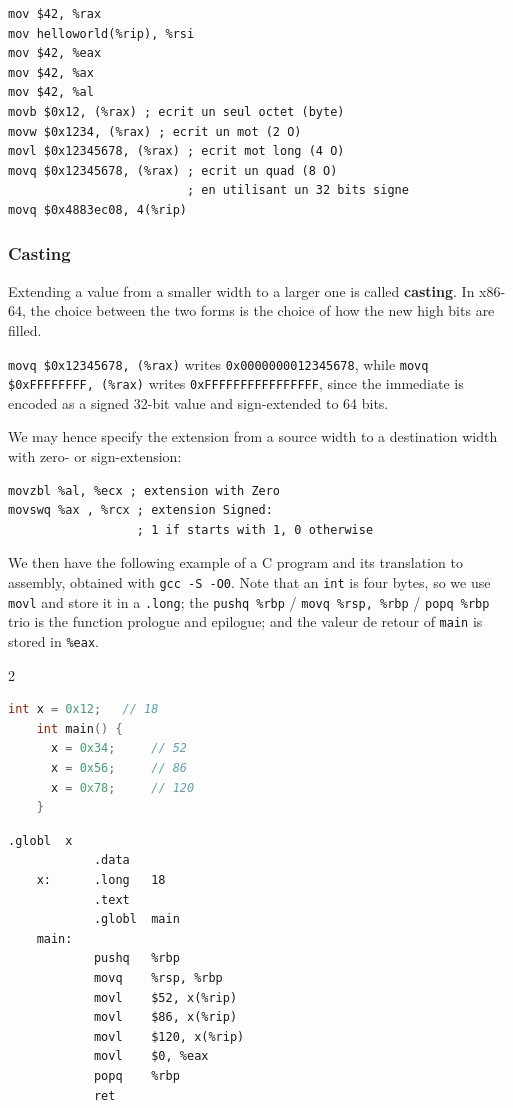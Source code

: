 \begin{lstlisting}[language=gas]
mov $42, %rax
mov helloworld(%rip), %rsi
mov $42, %eax
mov $42, %ax
mov $42, %al
movb $0x12, (%rax) ; ecrit un seul octet (byte)
movw $0x1234, (%rax) ; ecrit un mot (2 O)
movl $0x12345678, (%rax) ; ecrit mot long (4 O)
movq $0x12345678, (%rax) ; ecrit un quad (8 O)
                         ; en utilisant un 32 bits signe
movq $0x4883ec08, 4(%rip)
\end{lstlisting}

\subsubsection{Casting}
Extending a value from a smaller width to a larger one is called
\textbf{casting}. In x86-64, the choice between the two forms is the choice of
how the new high bits are filled.

\begin{example}[Casting]
  \verb|movq $0x12345678, (%rax)| writes \verb|0x0000000012345678|, while
  \verb|movq $0xFFFFFFFF, (%rax)| writes \verb|0xFFFFFFFFFFFFFFFF|, since
  the immediate is encoded as a signed 32-bit value and sign-extended to
  64 bits.
\end{example}

We may hence specify the extension from a source width to a destination width
with zero- or sign-extension:
\begin{lstlisting}[language=gas]
movzbl %al, %ecx ; extension with Zero
movswq %ax , %rcx ; extension Signed:
                  ; 1 if starts with 1, 0 otherwise
\end{lstlisting}

\begin{example}[C to Assembly]
  We then have the following example of a C program and its translation to assembly, obtained
  with \verb|gcc -S -O0|. Note that an \verb|int| is four bytes, so we use \verb|movl| and
  store it in a \verb|.long|; the \verb|pushq %rbp| / \verb|movq %rsp, %rbp| /
  \verb|popq %rbp| trio is the function prologue and epilogue; and the valeur de
  retour of \verb|main| is stored in \verb|%eax|.
  \begin{multicols}{2}
    \begin{lstlisting}[language=C]
    int x = 0x12;   // 18
    int main() {
      x = 0x34;     // 52
      x = 0x56;     // 86
      x = 0x78;     // 120
    }
    \end{lstlisting}\vfill\null
    
    \begin{lstlisting}[language=gas]
            .globl  x
            .data
    x:      .long   18
            .text
            .globl  main
    main:
            pushq   %rbp
            movq    %rsp, %rbp
            movl    $52, x(%rip)
            movl    $86, x(%rip)
            movl    $120, x(%rip)
            movl    $0, %eax
            popq    %rbp
            ret
    \end{lstlisting}
  \end{multicols}
\end{example}

